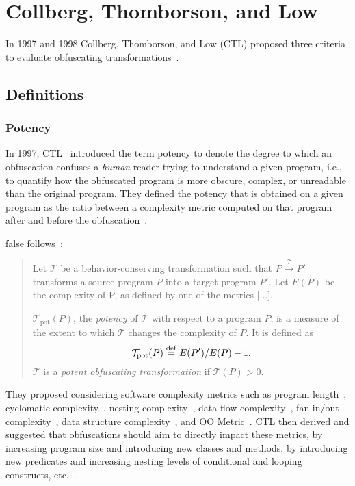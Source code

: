 \section{Collberg, Thomborson, and Low}

In 1997 and 1998 Collberg, Thomborson, and Low (CTL) proposed three criteria to evaluate obfuscating transformations~\cite{collberg1997taxonomy,collberg1998manufacturing}.

\subsection{Definitions}

\subsubsection{Potency}
In 1997, CTL~\cite{collberg1997taxonomy} introduced the term potency to denote the degree to which an obfuscation confuses a \emph{human} reader trying to understand a given program, i.e., to quantify how the obfuscated program is more obscure, complex, or unreadable than the original program. They defined the potency that is obtained on a given program as
the ratio between a complexity metric computed on that program after and before the obfuscation~\cite{collberg1997taxonomy}.

\if false
follows~\cite{collberg1997taxonomy}:
\begin{quote}
  Let $\mathcal{T}$ be a behavior-conserving transformation such that $P \overset{\mathcal{T}}{\rightarrow} P'$ transforms a source program $P$ into a target program $P'$. Let $E(P)$ be the complexity of P, as defined by one of the metrics [...].

  $\mathcal{T}_{\text{pot}}(P)$, the \emph{potency} of $\mathcal{T}$ with respect to a program $P$, is a measure of the extent to which $\mathcal{T}$ changes the complexity of $P$. It is defined as
  $$\mathcal{T}_{\text{pot}}(P) \overset{\mathrm{def}}{=} E(P')/E(P)-1.$$ 
$\mathcal{T}$ is a \emph{potent obfuscating transformation} if $\mathcal{T}(P)>0$.
\end{quote}
\fi

They proposed considering software complexity metrics such as program length~\cite{halstead}, cyclomatic complexity~\cite{mccabe1976}, nesting complexity~\cite{harrison1981}, data flow complexity~\cite{oviedo80}, fan-in/out complexity~\cite{flow_metrics}, data structure complexity~\cite{munson1993}, and OO Metric~\cite{OO-metric}. CTL then derived and suggested that obfuscations should aim to directly impact these metrics, by increasing program size and introducing new classes and methods, by introducing new predicates and increasing nesting levels of conditional and looping constructs, etc.~\cite{collberg1997taxonomy}.

